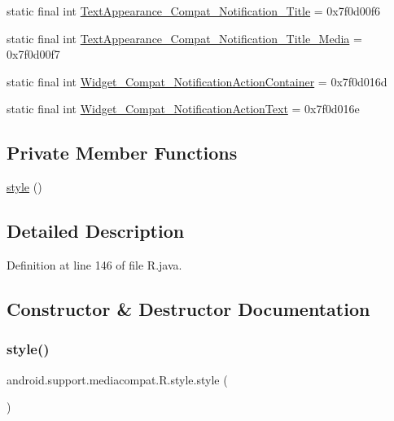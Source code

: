 \begin{DoxyCompactItemize}
\item 
static final int \mbox{\hyperlink{classandroid_1_1support_1_1mediacompat_1_1_r_1_1style_aa75457e1e96c65ecdca35ee5ee2e692f}{Text\+Appearance\+\_\+\+Compat\+\_\+\+Notification\+\_\+\+Title}} = 0x7f0d00f6
\item 
static final int \mbox{\hyperlink{classandroid_1_1support_1_1mediacompat_1_1_r_1_1style_ad021488f0d0c66c33d37969b120ad507}{Text\+Appearance\+\_\+\+Compat\+\_\+\+Notification\+\_\+\+Title\+\_\+\+Media}} = 0x7f0d00f7
\item 
static final int \mbox{\hyperlink{classandroid_1_1support_1_1mediacompat_1_1_r_1_1style_abbc9df391b3fc86a6b9a0b3c0122a743}{Widget\+\_\+\+Compat\+\_\+\+Notification\+Action\+Container}} = 0x7f0d016d
\item 
static final int \mbox{\hyperlink{classandroid_1_1support_1_1mediacompat_1_1_r_1_1style_a5b36689f13a047070defb7a11fd23580}{Widget\+\_\+\+Compat\+\_\+\+Notification\+Action\+Text}} = 0x7f0d016e
\end{DoxyCompactItemize}
\subsection*{Private Member Functions}
\begin{DoxyCompactItemize}
\item 
\mbox{\hyperlink{classandroid_1_1support_1_1mediacompat_1_1_r_1_1style_a908e9b89cdccdcd124d201eb642830a6}{style}} ()
\end{DoxyCompactItemize}


\subsection{Detailed Description}


Definition at line 146 of file R.\+java.



\subsection{Constructor \& Destructor Documentation}
\mbox{\label{classandroid_1_1support_1_1mediacompat_1_1_r_1_1style_a908e9b89cdccdcd124d201eb642830a6}} 
\subsubsection{\texorpdfstring{style()}{style()}}
{\footnotesize\ttfamily android.\+support.\+mediacompat.\+R.\+style.\+style (\begin{DoxyParamCaption}{ }\end{DoxyParamCaption})\hspace{0.3cm}{\ttfamily [private]}}



